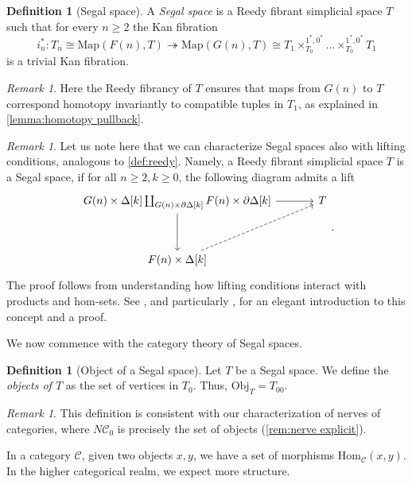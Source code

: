 \documentclass[11pt, a4paper]{amsart}
\newcommand{\cC}{\mathcal{C}}
\newcommand{\Hom}{\mathrm{Hom}}
\newcommand{\Map}{\mathrm{Map}}
\newcommand{\Obj}{\mathrm{Obj}}
\theoremstyle{definition}
\newtheorem{definition}[equation]{Definition}
\theoremstyle{remark}
\newtheorem{remark}[equation]{Remark}
\numberwithin{equation}{section}
\begin{document}
\begin{definition}[Segal space] \label{def:segal space}
  A \emph{Segal space} is a Reedy fibrant simplicial space $T$ such that for every $n \geq 2$ the Kan fibration
  \[i^*_n\colon T_n \cong \Map(F(n),T) \twoheadrightarrow \Map(G(n),T) \cong T_1 \times_{T_0}^{1^*,0^*} ... \times_{T_0}^{1^*,0^*} T_1\]
  is a trivial Kan fibration.
\end{definition}

\begin{remark}
  Here the Reedy fibrancy of $T$ ensures that maps from $G(n)$ to $T$ correspond homotopy invariantly to compatible tuples in $T_1$, as explained in \cref{lemma:homotopy pullback}.
\end{remark}

\begin{remark} \label{rem:segal space lifting}
  Let us note here that we can characterize Segal spaces also with lifting conditions, analogous to \cref{def:reedy}. Namely, a Reedy fibrant simplicial space $T$ is a Segal space, if for all $n \geq 2, k \geq 0$, the following diagram admits a lift
  \[
  \begin{tikzcd}[row sep=1.2cm, column sep=1.2cm]
   G(n) \times \Delta[k] \coprod_{G(n) \times \partial \Delta[k]} F(n) \times \partial \Delta[k] \arrow[r] \arrow[d] & T \\
   F(n) \times \Delta[k] \arrow[ur, dashed]
  \end{tikzcd}.
  \]
  The proof follows from understanding how lifting conditions interact with products and hom-sets. See \cite[Section 21]{rezk2022qcats}, and particularly \cite[Proposition 21.5]{rezk2022qcats}, for an elegant introduction to this concept and a proof.
\end{remark}

We now commence with the category theory of Segal spaces.

 \begin{definition}[Object of a Segal space] \label{def:objects of segal space}
  Let $T$ be a Segal space. We define the \emph{objects of $T$} as the set of vertices in $T_0$. Thus, $\Obj_T = T_{00}$.
 \end{definition}

 \begin{remark}
  This definition is consistent with our characterization of nerves of categories, where $N\cC_0$ is precisely the set of objects (\cref{rem:nerve explicit}).
 \end{remark}

 In a category $\cC$, given two objects $x, y$, we have a set of morphisms $\Hom_\cC(x,y)$. In the higher categorical realm, we expect more structure.
\end{document}
